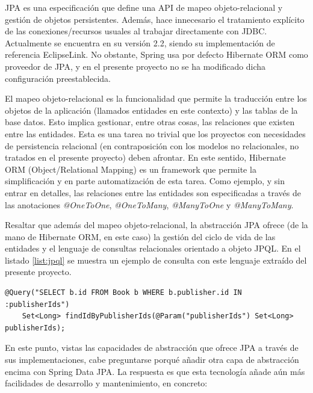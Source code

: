 \documentclass[a4paper]{article}
\begin{document}
    JPA es una especificación que define una API de mapeo objeto-relacional y gestión de objetos persistentes. Además, hace innecesario el tratamiento explícito de las conexiones/recursos usuales al trabajar directamente con JDBC. Actualmente se encuentra en su versión 2.2, siendo su implementación de referencia EclipseLink. No obstante, Spring usa por defecto Hibernate ORM como proveedor de JPA, y en el presente proyecto no se ha modificado dicha configuración preestablecida.
    
    El mapeo objeto-relacional es la funcionalidad que permite la traducción entre los objetos de la aplicación (llamados entidades en este contexto) y las tablas de la base datos. Esto implica gestionar, entre otras cosas, las relaciones que existen entre las entidades. Esta es una tarea no trivial que los proyectos con necesidades de persistencia relacional (en contraposición con los modelos no relacionales, no tratados en el presente proyecto) deben afrontar. En este sentido, Hibernate ORM (Object/Relational Mapping) es un framework que permite la simplificación y en parte automatización de esta tarea. Como ejemplo, y sin entrar en detalles, las relaciones entre las entidades son especificadas a través de las anotaciones \emph{@OneToOne}, \emph{@OneToMany}, \emph{@ManyToOne} y \emph{@ManyToMany}.
    
    Resaltar que además del mapeo objeto-relacional, la abstracción JPA ofrece (de la mano de Hibernate ORM, en este caso) la gestión del ciclo de vida de las entidades y el lenguaje de consultas relacionales orientado a objeto JPQL. En el listado \ref{list:jpql} se muestra un ejemplo de consulta con este lenguaje extraído del presente proyecto.
    
    \begin{lstlisting}[caption=Ejemplo de consulta especificada en JPQL,label=list:jpql]
    @Query("SELECT b.id FROM Book b WHERE b.publisher.id IN :publisherIds")
    Set<Long> findIdByPublisherIds(@Param("publisherIds") Set<Long> publisherIds);
    \end{lstlisting}
    
    En este punto, vistas las capacidades de abstracción que ofrece JPA a través de sus implementaciones, cabe preguntarse porqué añadir otra capa de abstracción encima con Spring Data JPA. La respuesta es que esta tecnología añade aún más facilidades de desarrollo y mantenimiento, en concreto:
    
\end{document}
